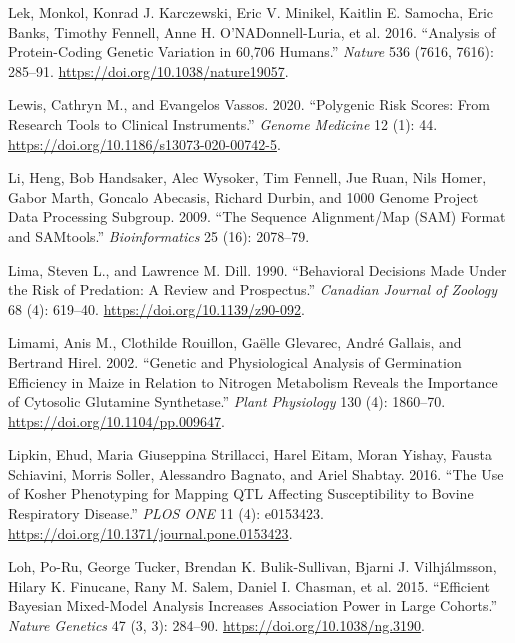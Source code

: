 \documentclass[
]{book}
\newlength{\cslhangindent}
\newlength{\cslentryspacingunit} %
\newenvironment{CSLReferences}[2] %
 {%
  \setlength{\parindent}{0pt}
  \ifodd #1
  \let\oldpar\par
  \def\par{\hangindent=\cslhangindent\oldpar}
  \fi
  \setlength{\parskip}{#2\cslentryspacingunit}
 }%
 {}
\begin{document}
\begin{CSLReferences}{1}{0}
\leavevmode{}%
Lek, Monkol, Konrad J. Karczewski, Eric V. Minikel, Kaitlin E. Samocha, Eric Banks, Timothy Fennell, Anne H. O'NADonnell-Luria, et al. 2016. {``Analysis of Protein-Coding Genetic Variation in 60,706 Humans.''} \emph{Nature} 536 (7616, 7616): 285--91. \url{https://doi.org/10.1038/nature19057}.

\leavevmode{}%
Lewis, Cathryn M., and Evangelos Vassos. 2020. {``Polygenic Risk Scores: From Research Tools to Clinical Instruments.''} \emph{Genome Medicine} 12 (1): 44. \url{https://doi.org/10.1186/s13073-020-00742-5}.

\leavevmode{}%
Li, Heng, Bob Handsaker, Alec Wysoker, Tim Fennell, Jue Ruan, Nils Homer, Gabor Marth, Goncalo Abecasis, Richard Durbin, and 1000 Genome Project Data Processing Subgroup. 2009. {``The {Sequence} Alignment/Map ({SAM}) Format and {SAMtools}.''} \emph{Bioinformatics} 25 (16): 2078--79.

\leavevmode{}%
Lima, Steven L., and Lawrence M. Dill. 1990. {``Behavioral Decisions Made Under the Risk of Predation: A Review and Prospectus.''} \emph{Canadian Journal of Zoology} 68 (4): 619--40. \url{https://doi.org/10.1139/z90-092}.

\leavevmode{}%
Limami, Anis M., Clothilde Rouillon, Gaëlle Glevarec, André Gallais, and Bertrand Hirel. 2002. {``Genetic and {Physiological Analysis} of {Germination Efficiency} in {Maize} in {Relation} to {Nitrogen Metabolism Reveals} the {Importance} of {Cytosolic Glutamine Synthetase}.''} \emph{Plant Physiology} 130 (4): 1860--70. \url{https://doi.org/10.1104/pp.009647}.

\leavevmode{}%
Lipkin, Ehud, Maria Giuseppina Strillacci, Harel Eitam, Moran Yishay, Fausta Schiavini, Morris Soller, Alessandro Bagnato, and Ariel Shabtay. 2016. {``The {Use} of {Kosher Phenotyping} for {Mapping QTL Affecting Susceptibility} to {Bovine Respiratory Disease}.''} \emph{PLOS ONE} 11 (4): e0153423. \url{https://doi.org/10.1371/journal.pone.0153423}.

\leavevmode{}%
Loh, Po-Ru, George Tucker, Brendan K. Bulik-Sullivan, Bjarni J. Vilhjálmsson, Hilary K. Finucane, Rany M. Salem, Daniel I. Chasman, et al. 2015. {``Efficient {Bayesian} Mixed-Model Analysis Increases Association Power in Large Cohorts.''} \emph{Nature Genetics} 47 (3, 3): 284--90. \url{https://doi.org/10.1038/ng.3190}.


\end{CSLReferences}
\end{document}
